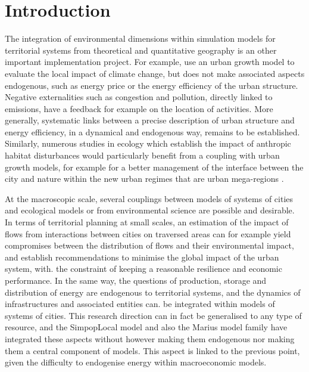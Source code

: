 \maketitle

\begin{abstract}

\end{abstract}


\section{Introduction}



The integration of environmental dimensions within simulation models for territorial systems from theoretical and quantitative geography is an other important implementation project. For example, \cite{viguie2014downscaling} use an urban growth model to evaluate the local impact of climate change, but does not make associated aspects endogenous, such as energy price or the energy efficiency of the urban structure. Negative externalities such as congestion and pollution, directly linked to emissions, have a feedback for example on the location of activities. More generally, systematic links between a precise description of urban structure and energy efficiency, in a dynamical and endogenous way, remains to be established. Similarly, numerous studies in ecology which establish the impact of anthropic habitat disturbances would particularly benefit from a coupling with urban growth models, for example for a better management of the interface between the city and nature within the new urban regimes that are urban mega-regions \cite{hall2006polycentric}.

At the macroscopic scale, several couplings between models of systems of cities and ecological models or from environmental science are possible and desirable. In terms of territorial planning at small scales, an estimation of the impact of flows from interactions between cities on traversed areas can for example yield compromises between the distribution of flows and their environmental impact, and establish recommendations to minimise the global impact of the urban system, with. the constraint of keeping a reasonable resilience and economic performance. In the same way, the questions of production, storage and distribution of energy are endogenous to territorial systems, and the dynamics of infrastructures and associated entities can. be integrated within models of systems of cities. This research direction can in fact be generalised to any type of resource, and the SimpopLocal model \cite{pumain2017simpoplocal} and also the Marius model family \cite{cottineau2015modular} have integrated these aspects without however making them endogenous nor making them a central component of models. This aspect is linked to the previous point, given the difficulty to endogenise energy within macroeconomic models.

